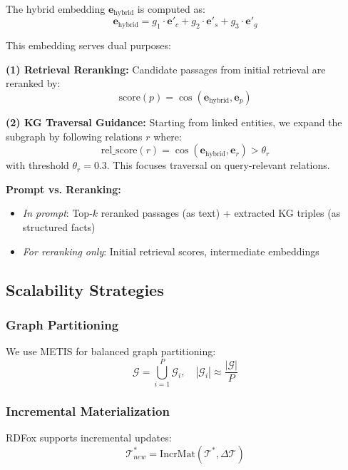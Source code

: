 \documentclass[10pt,twocolumn]{article}
\begin{document}
The hybrid embedding $\mathbf{e}_{\text{hybrid}}$ is computed as:
\begin{equation}
\mathbf{e}_{\text{hybrid}} = g_1 \cdot \mathbf{e}'_c + g_2 \cdot \mathbf{e}'_s + g_3 \cdot \mathbf{e}'_g
\end{equation}

This embedding serves dual purposes:

\textbf{(1) Retrieval Reranking:} Candidate passages from initial retrieval are reranked by:
\begin{equation}
\text{score}(p) = \cos(\mathbf{e}_{\text{hybrid}}, \mathbf{e}_p)
\end{equation}

\textbf{(2) KG Traversal Guidance:} Starting from linked entities, we expand the subgraph by following relations $r$ where:
\begin{equation}
\text{rel\_score}(r) = \cos(\mathbf{e}_{\text{hybrid}}, \mathbf{e}_r) > \theta_r
\end{equation}
with threshold $\theta_r = 0.3$. This focuses traversal on query-relevant relations.

\textbf{Prompt vs. Reranking:}
\begin{itemize}
    \item \textit{In prompt}: Top-$k$ reranked passages (as text) + extracted KG triples (as structured facts)
    \item \textit{For reranking only}: Initial retrieval scores, intermediate embeddings
\end{itemize}


\subsection{Scalability Strategies}
\label{sec:scale}

\subsubsection{Graph Partitioning}
We use METIS \cite{karypis1998metis} for balanced graph partitioning:
\begin{equation}
\mathcal{G} = \bigcup_{i=1}^{P} \mathcal{G}_i, \quad |\mathcal{G}_i| \approx \frac{|\mathcal{G}|}{P}
\end{equation}

\subsubsection{Incremental Materialization}
RDFox supports incremental updates:
\begin{equation}
\mathcal{T}^*_{new} = \text{IncrMat}(\mathcal{T}^*, \Delta\mathcal{T})
\end{equation}
\end{document}
